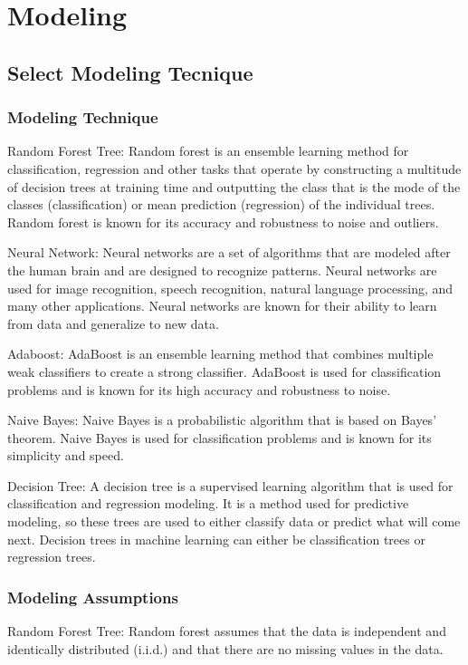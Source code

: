 \chapter{Modeling}

\section{Select Modeling Tecnique}

\subsection{Modeling Technique}
Random Forest Tree: Random forest is an ensemble learning method for classification, regression and other tasks that operate by constructing a multitude of decision trees at training time and outputting the class that is the mode of the classes (classification) or mean prediction (regression) of the individual trees. Random forest is known for its accuracy and robustness to noise and outliers.

Neural Network: Neural networks are a set of algorithms that are modeled after the human brain and are designed to recognize patterns. Neural networks are used for image recognition, speech recognition, natural language processing, and many other applications. Neural networks are known for their ability to learn from data and generalize to new data.

Adaboost: AdaBoost is an ensemble learning method that combines multiple weak classifiers to create a strong classifier. AdaBoost is used for classification problems and is known for its high accuracy and robustness to noise.

Naive Bayes: Naive Bayes is a probabilistic algorithm that is based on Bayes’ theorem. Naive Bayes is used for classification problems and is known for its simplicity and speed.

Decision Tree: A decision tree is a supervised learning algorithm that is used for classification and regression modeling. It is a method used for predictive modeling, so these trees are used to either classify data or predict what will come next. Decision trees in machine learning can either be classification trees or regression trees. 

\subsection{Modeling Assumptions}
Random Forest Tree: Random forest assumes that the data is independent and identically distributed (i.i.d.) and that there are no missing values in the data.

